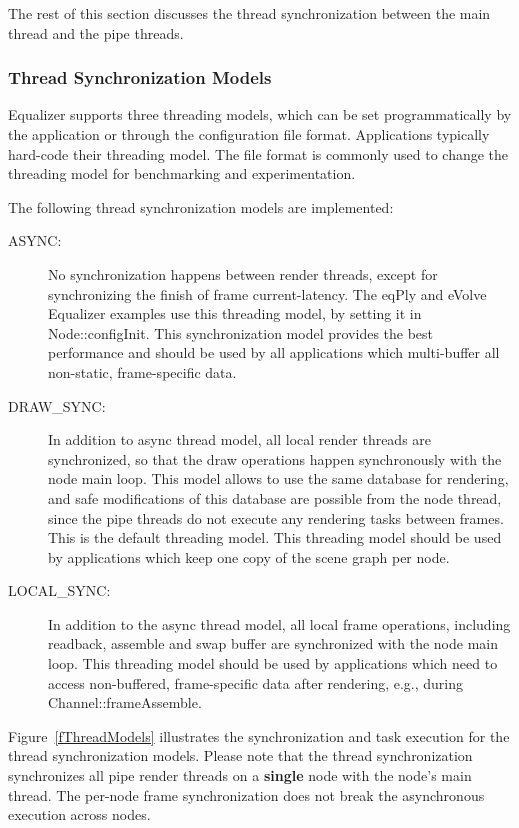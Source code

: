 \documentclass[10pt,a4]{scrartcl}
\newcommand{\fig}[1]{Figure~\ref{#1}}
\begin{document}
The rest of this section discusses the thread synchronization between
the main thread and the pipe threads.


\subsubsection{\label{sThreadModel}Thread Synchronization Models}
Equalizer supports three threading models, which can be set
programmatically by the application or through the configuration file
format. Applications typically hard-code their threading model. The file
format is commonly used to change the threading model for benchmarking
and experimentation.

The following thread synchronization models are implemented:
\begin{description}
\item[ASYNC:] No synchronization happens between render threads, except
  for synchronizing the finish of frame \textsf{current-latency}. The
  \textsf{eqPly} and \textsf{eVolve} Equalizer examples use this
  threading model, by setting it in \textsf{Node::configInit}. This
  synchronization model provides the best performance and should be used
  by all applications which multi-buffer all non-static, frame-specific
  data.
\item[DRAW\_SYNC:] In addition to async thread model, all local render
  threads are synchronized, so that the draw operations happen
  synchronously with the node main loop. This model allows to use the
  same database for rendering, and safe modifications of this database
  are possible from the node thread, since the pipe threads do not
  execute any rendering tasks between frames. This is the default
  threading model. This threading model should be used by applications
  which keep one copy of the scene graph per node.
\item[LOCAL\_SYNC:] In addition to the async thread model, all local
  frame operations, including readback, assemble and swap buffer are
  synchronized with the node main loop. This threading model should be
  used by applications which need to access non-buffered, frame-specific
  data after rendering, e.g., during \textsf{Channel::frameAssemble}.
\end{description}

\fig{fThreadModels} illustrates the synchronization and task execution
for the thread synchronization models. Please note that the thread
synchronization synchronizes all pipe render threads on a
\textbf{single} node with the node's main thread. The per-node frame
synchronization does not break the asynchronous execution across
nodes.
\end{document}
